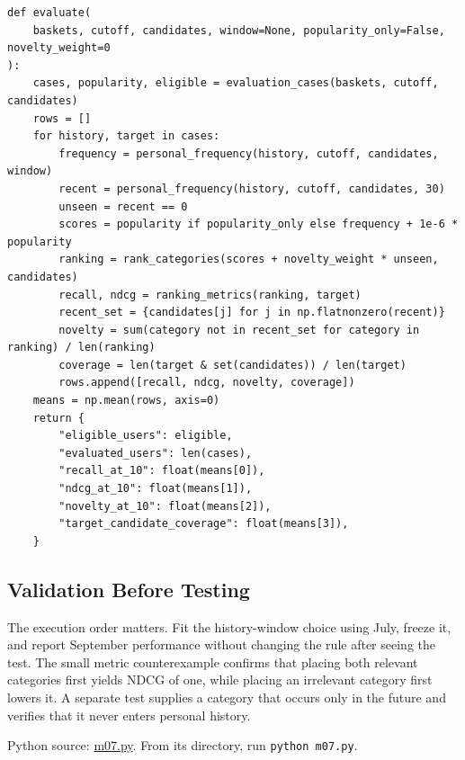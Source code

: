 \begin{Verbatim}[breaklines,breakanywhere,fontsize=\small]
def evaluate(
    baskets, cutoff, candidates, window=None, popularity_only=False, novelty_weight=0
):
    cases, popularity, eligible = evaluation_cases(baskets, cutoff, candidates)
    rows = []
    for history, target in cases:
        frequency = personal_frequency(history, cutoff, candidates, window)
        recent = personal_frequency(history, cutoff, candidates, 30)
        unseen = recent == 0
        scores = popularity if popularity_only else frequency + 1e-6 * popularity
        ranking = rank_categories(scores + novelty_weight * unseen, candidates)
        recall, ndcg = ranking_metrics(ranking, target)
        recent_set = {candidates[j] for j in np.flatnonzero(recent)}
        novelty = sum(category not in recent_set for category in ranking) / len(ranking)
        coverage = len(target & set(candidates)) / len(target)
        rows.append([recall, ndcg, novelty, coverage])
    means = np.mean(rows, axis=0)
    return {
        "eligible_users": eligible,
        "evaluated_users": len(cases),
        "recall_at_10": float(means[0]),
        "ndcg_at_10": float(means[1]),
        "novelty_at_10": float(means[2]),
        "target_candidate_coverage": float(means[3]),
    }
\end{Verbatim}

\hypertarget{M07-validation-before-testing}{%
\subsection{Validation Before
Testing}\label{M07-validation-before-testing}}

\noindent The execution order matters. Fit the history-window choice using July,
freeze it, and report September performance without changing the rule
after seeing the test. The small metric counterexample confirms that
placing both relevant categories first yields NDCG of one, while placing
an irrelevant category first lowers it. A separate test supplies a
category that occurs only in the future and verifies that it never
enters personal history.

\FloatBarrier
{}
Python source:
\href{../03_Data_and_Code/mHealth/recurring_examples/m07.py}{m07.py}.
From its directory, run \texttt{python\ m07.py}.

